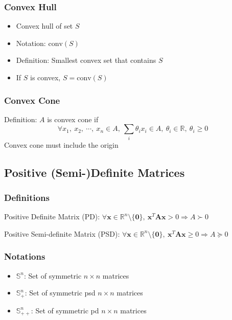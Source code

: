 \subsubsection*{Convex Hull}
\begin{itemize}
    \item Convex hull of set $S$
    \item Notation: $\mathrm{conv}(S)$
    \item Definition: Smallest convex set that contains $S$
    \item If $S$ is convex, $S = \mathrm{conv}(S)$
\end{itemize}

\subsubsection*{Convex Cone}
Definition: $A$ is convex cone if
$$
\forall x_1,~x_2,~\cdots,~x_n \in A,~\sum_i \theta_i x_i \in A,~\theta_i \in \mathbb{R},~ \theta_i \geq 0
$$
Convex cone must include the origin

\subsection{Positive (Semi-)Definite Matrices}

\subsubsection*{Definitions}
Positive Definite Matrix (PD): 
$ \forall \mathbf{x} \in \mathbb{R}^n \setminus \{\mathbf{0}\},~ \mathbf{x}^T\mathbf{A}\mathbf{x} > 0 \Rightarrow A \succ 0$

Positive Semi-definite Matrix (PSD): 
$ \forall \mathbf{x} \in \mathbb{R}^n \setminus \{\mathbf{0}\},~ \mathbf{x}^T\mathbf{A}\mathbf{x} \geq 0 \Rightarrow A \succeq 0$

\subsubsection*{Notations}
\begin{itemize}
    \item $\mathbb{S}^n$: Set of symmetric $n \times n$ matrices
    \item $\mathbb{S}^n_+$: Set of symmetric psd $n \times n$ matrices
    \item $\mathbb{S}^n_{++}$: Set of symmetric pd $n \times n$ matrices
\end{itemize}

